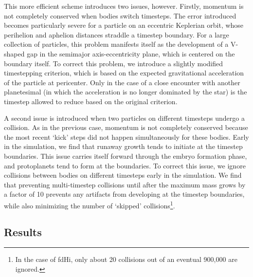 \documentclass[twocolumn]{aastex63}
\begin{document}
This more efficient scheme introduces two issues, however. Firstly,
momentum is not completely conserved when bodies switch timesteps. The
error introduced becomes particularly severe for a particle on an
eccentric Keplerian orbit, whose perihelion and aphelion distances
straddle a timestep boundary. For a large collection of particles,
this problem manifests itself as the development of a V-shaped gap in the semimajor axis-eccentricity plane, which is centered on the boundary itself. To correct this problem, we introduce a slightly modified timestepping criterion, which is based on the expected gravitational acceleration of the particle at pericenter. Only in the case of a close encounter with another planetesimal (in which the acceleration is no longer dominated by the star) is the timestep allowed to reduce based on the original criterion.

A second issue is introduced when two particles on different timesteps undergo a collision. As in the previous case, momentum is not completely conserved because the most recent `kick' steps did not happen simultaneously for these bodies. Early in the simulation, we find that runaway growth tends to initiate at the timestep boundaries. This issue carries itself forward through the embryo formation phase, and protoplanets tend to form at the boundaries. To correct this issue, we ignore collisions between bodies on different timesteps early in the simulation. We find that preventing multi-timestep collisions until after the maximum mass grows by a factor of 10 prevents any artifacts from developing at the timestep boundaries, while also minimizing the number of `skipped' collisions\footnote{In the case of fdHi, only about 20 collisions out of an eventual 900,000 are ignored.}. 

\subsection{Results}
\end{document}
